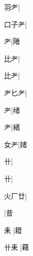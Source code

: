 \begin{multicols}{2}
{{\cjk{}{\cnsym{}　}羽耂}\mktsJzrVerticalBar{}{\cjk{}{\cnsym{}　}{\cnsym{}　}{\cnsym{}　}}|{}\par
{\cjk{}口子耂}|{}\par
{耂}\mktsJzrVerticalBar{}{\cjk{}{\cnsym{}　}{\cnsym{}　}{\cnsym{}　}}|{\cjk{}陼}\par
{比耂}\mktsJzrVerticalBar{}{\cjk{}{\cnsym{}　}{\cnsym{}　}{\cnsym{}　}}|{}\par
{比耂}\mktsJzrVerticalBar{}{\cjk{}{\cnsym{}　}{\cnsym{}　}{\cnsym{}　}}|{}\par
{\cjk{}耂匕耂}\mktsJzrVerticalBar{}{\cjk{}{\cnsym{}　}{\cnsym{}　}{\cnsym{}　}}|{}\par
{耂}\mktsJzrVerticalBar{}{\cjk{}{\cnsym{}　}{\cnsym{}　}{\cnsym{}　}}|{\cjk{}绪}\par
{耂}\mktsJzrVerticalBar{}{\cjk{}{\cnsym{}　}{\cnsym{}　}{\cnsym{}　}}|{\cjk{}緒}\par
{\cjk{}{\cnsym{}　}女耂}\mktsJzrVerticalBar{}{\cjk{}{\cnsym{}　}{\cnsym{}　}{\cnsym{}　}}|{\cjk{}媎}\par
{\cjk{}{\cnsym{}　}{\cnsym{}　}卄}\mktsJzrVerticalBar{}{\cjk{}{\cnsym{}　}{\cnsym{}　}{\cnsym{}　}}|{}\par
{卄}\mktsJzrVerticalBar{}{\cjk{}{\cnsym{}　}{\cnsym{}　}{\cnsym{}　}}|{}\par
{\cjk{}火厂廿}\mktsJzrVerticalBar{}{\cjk{}{\cnsym{}　}{\cnsym{}　}{\cnsym{}　}}|{}\par
{}\mktsJzrVerticalBar{}{\cjk{}{\cnsym{}　}{\cnsym{}　}{\cnsym{}　}}|{\cjk{}昔}\par
{\cjk{}{\cnsym{}　}耒{\cnxJzr{}}}\mktsJzrVerticalBar{}{\cjk{}{\cnsym{}　}{\cnsym{}　}{\cnsym{}　}}|{\cjk{}耤}\par
{\cjk{}卄耒{\cnxJzr{}}}\mktsJzrVerticalBar{}{\cjk{}{\cnsym{}　}{\cnsym{}　}{\cnsym{}　}}|{\cjk{}藉}\par
}
\end{multicols}
